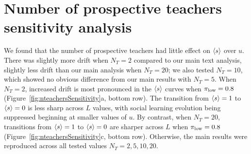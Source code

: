 \documentclass[letterpaper,11.5pt]{scrartcl}
\begin{document}
\clearpage

\section{Number of prospective teachers sensitivity analysis}

We found that the number of prospective teachers had little effect on $\langle s \rangle$
over $u$. There was slightly more drift when $N_T = 2$ compared to our 
main text analysis, slightly less drift than our main analysis when $N_T = 20$; 
we also tested $N_T=10$, which showed no obvious difference from our main results
with $N_T = 5$. When $N_T = 2$, increased drift is most pronounced in the
$\langle s \rangle$ curves when $\pi_{\mathrm{low}}=0.8$ (Figure~\ref{fig:nteachersSensitivity}a, 
bottom row). The transition from $\langle s \rangle = 1$ to $\langle s \rangle = 0$ is less sharp
across $L$ values, with social learning evolution being suppressed beginning
at smaller values of $u$. By contrast, when $N_T = 20$, transitions from 
$\langle s \rangle = 1$ to $\langle s \rangle = 0$ are sharper across $L$ when $\pi_{\mathrm{low}} = 0.8$
(Figure~\ref{fig:nteachersSensitivity}c, bottom row). Otherwise, the main 
results were reproduced across all tested values $N_T=2,5,10,20$.

\clearpage
\end{document}
